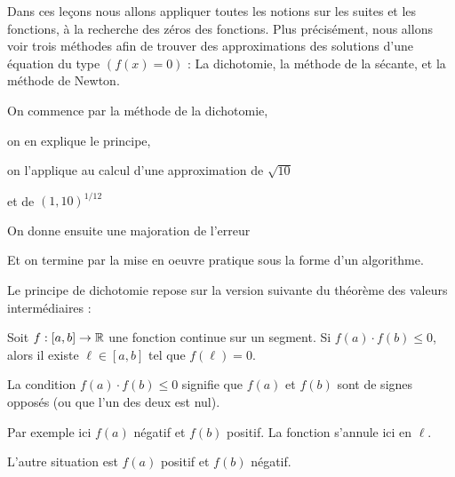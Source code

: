 







\debuttexte


\diapo


Dans ces leçons nous allons appliquer toutes les notions sur les suites et les fonctions,
à la recherche des zéros des fonctions. Plus précisément, nous allons voir trois méthodes afin
de trouver des approximations des solutions d'une équation du type $(f(x)=0)$ :
La dichotomie, la méthode de la sécante, et la méthode de Newton.


\change

On commence par la méthode de la dichotomie,

\change

on en explique le principe,

\change

on l'applique au calcul d'une approximation de $\sqrt{10}$

\change

et de $(1,10)^{1/12}$

\change

On donne ensuite une majoration de l'erreur

\change

Et on termine par la mise en oeuvre pratique sous la forme d'un algorithme.


\diapo

Le principe de dichotomie repose sur la version suivante du théorème des valeurs intermédiaires :

Soit $f:[a,b]\to\mathbb{R}$ une fonction continue sur un segment. 
Si $f(a)\cdot f(b) \le 0$, alors il existe $\ell\in[a,b]$ tel que $f(\ell)=0$.



La condition $f(a)\cdot f(b)\le0$ signifie que $f(a)$ et $f(b)$ 
sont de signes opposés (ou que l'un des deux est nul). 


\change

Par exemple ici $f(a)$ négatif et $f(b)$ positif.
La fonction s'annule ici en $\ell$.


\change

L'autre situation est $f(a)$ positif et $f(b)$ négatif.

